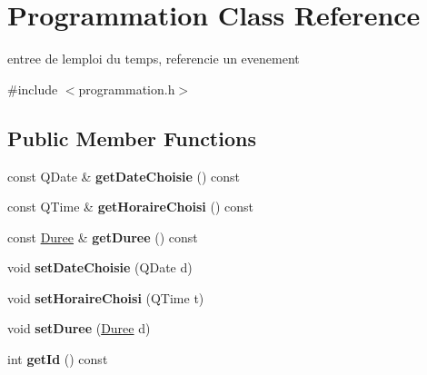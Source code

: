 \hypertarget{class_programmation}{}\section{Programmation Class Reference}
\label{class_programmation}


entree de l\textquotesingle{}emploi du temps, referencie un evenement  




{\ttfamily \#include $<$programmation.\+h$>$}

\subsection*{Public Member Functions}
\begin{DoxyCompactItemize}
\item 
\hypertarget{class_programmation_ad55acbdd7059371d5b2ebf0a2b43597a}{}const Q\+Date \& {\bfseries get\+Date\+Choisie} () const \label{class_programmation_ad55acbdd7059371d5b2ebf0a2b43597a}

\item 
\hypertarget{class_programmation_a95a28145c5eca80db8e7804404519595}{}const Q\+Time \& {\bfseries get\+Horaire\+Choisi} () const \label{class_programmation_a95a28145c5eca80db8e7804404519595}

\item 
\hypertarget{class_programmation_a0cbf62a3f0efd174de69e7019e0dc8ed}{}const \hyperlink{class_duree}{Duree} \& {\bfseries get\+Duree} () const \label{class_programmation_a0cbf62a3f0efd174de69e7019e0dc8ed}

\item 
\hypertarget{class_programmation_a7cd81da6d10a29782d21e6eb0d0910d6}{}void {\bfseries set\+Date\+Choisie} (Q\+Date d)\label{class_programmation_a7cd81da6d10a29782d21e6eb0d0910d6}

\item 
\hypertarget{class_programmation_ab8d0445e7fcca977527e6cdcc6237fba}{}void {\bfseries set\+Horaire\+Choisi} (Q\+Time t)\label{class_programmation_ab8d0445e7fcca977527e6cdcc6237fba}

\item 
\hypertarget{class_programmation_a54812c3cd58224600a3d62738946a3c4}{}void {\bfseries set\+Duree} (\hyperlink{class_duree}{Duree} d)\label{class_programmation_a54812c3cd58224600a3d62738946a3c4}

\item 
\hypertarget{class_programmation_ab4373ed1d42d39a830fdbac7385e69eb}{}int {\bfseries get\+Id} () const \label{class_programmation_ab4373ed1d42d39a830fdbac7385e69eb}


\end{DoxyCompactItemize}
